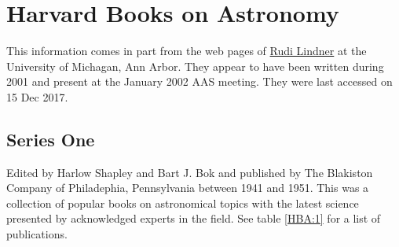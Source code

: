 \section{Harvard Books on Astronomy}

This information comes in part from the web pages of
\href{http://www-personal.umich.edu/~rpl/HarvardBooksOnAstronomy.htm}{Rudi
  Lindner} at the University of Michagan, Ann Arbor. They appear to
have been written during 2001 and present at the January 2002 AAS
meeting. They were last accessed on 15 Dec 2017.

\subsection{Series One}

Edited by Harlow Shapley and Bart J. Bok and published by The
Blakiston Company of Philadephia, Pennsylvania between 1941 and 1951.
This was a collection of popular books on astronomical topics with the
latest science presented by acknowledged experts in the field. See
table \ref{HBA:1} for a list of publications.


